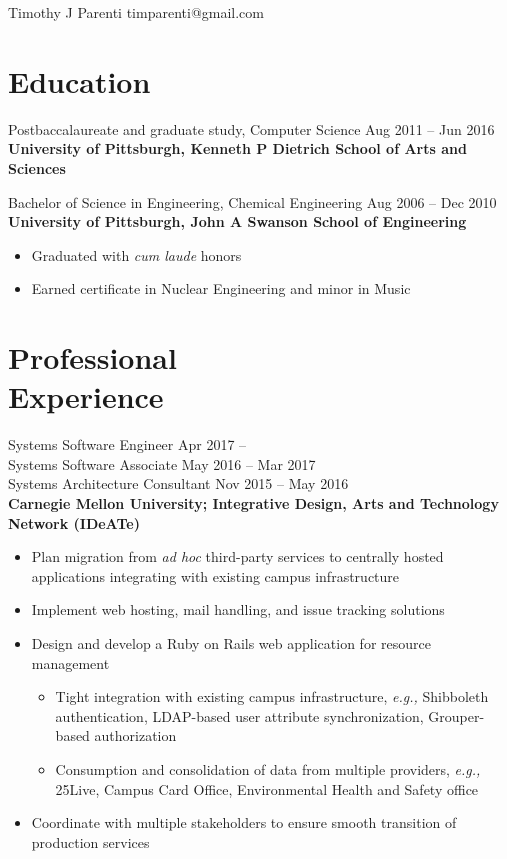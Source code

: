 \documentclass[11pt]{article}
\newcommand{\textdb}[1]{\fontseries{db}\selectfont#1\normalfont}
\newcommand{\present}{\phantom{Xxx 20XX}}
\begin{document}
\begin{adjustwidth}{-1in}{0pt}
	\textsf{\Huge{Timothy J Parenti}} \hfill timparenti@gmail.com \par
	\hrulefill
\end{adjustwidth}



\section{Education}

\textdb{
Postbaccalaureate and graduate study, Computer Science
	\hfill Aug 2011 -- Jun 2016 \\
}
\textbf{University of Pittsburgh, Kenneth P Dietrich School of Arts and Sciences}

\textdb{
Bachelor of Science in Engineering, Chemical Engineering
	\hfill Aug 2006 -- Dec 2010 \\
}
\textbf{University of Pittsburgh, John A Swanson School of Engineering}
\begin{itemize}
	\item Graduated with \emph{cum laude} honors
	\item Earned certificate in Nuclear Engineering and minor in Music
\end{itemize}



\section{Professional\\ Experience}

\textdb{
Systems Software Engineer
	\hfill Apr 2017 -- \present \\
}
\textdb{
Systems Software Associate
	\hfill May 2016 -- Mar 2017 \\
}
\textdb{
Systems Architecture Consultant
	\hfill Nov 2015 -- May 2016 \\
}
\textbf{Carnegie Mellon University; Integrative Design, Arts and Technology Network (IDeATe)}
\begin{itemize}
	\item Plan migration from \emph{ad hoc} third-party services
		to centrally hosted applications
		integrating with existing campus infrastructure
	\item Implement web hosting, mail handling, and issue tracking solutions
	\item Design and develop a Ruby on Rails web application for resource management
		\begin{itemize}
			\item Tight integration with existing campus infrastructure, \emph{e.g.,}
				Shibboleth authentication,
				LDAP-based user attribute synchronization,
				Grouper-based authorization
			\item Consumption and consolidation of data from multiple providers, \emph{e.g.,}
				25Live,
				Campus Card Office,
				Environmental Health and Safety office
		\end{itemize}
	\item Coordinate with multiple stakeholders
		to ensure smooth transition of production services
\end{itemize}
\end{document}
